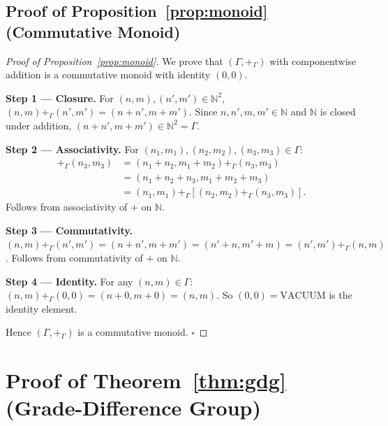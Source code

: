 
\subsection*{Proof of Proposition~\ref{prop:monoid} (Commutative Monoid)}
\label{app:proofs-monoid}

\begin{proof}[Proof of Proposition~\ref{prop:monoid}]
We prove that $(\Gamma, +_\Gamma)$ with componentwise addition is a
commutative monoid with identity $(0,0)$.

\medskip
\textbf{Step 1 --- Closure.}
For $(n,m),(n',m')\in\mathbb{N}^2$, $(n,m)+_\Gamma(n',m') = (n+n', m+m')$.
Since $n,n',m,m'\in\mathbb{N}$ and $\mathbb{N}$ is closed under addition,
$(n+n', m+m')\in\mathbb{N}^2 = \Gamma$. \checkmark

\medskip
\textbf{Step 2 --- Associativity.}
For $(n_1,m_1),(n_2,m_2),(n_3,m_3)\in\Gamma$:
\begin{align*}
  [(n_1,m_1)+_\Gamma(n_2,m_2)] +_\Gamma (n_3,m_3)
  &= (n_1+n_2, m_1+m_2) +_\Gamma (n_3,m_3) \\
  &= (n_1+n_2+n_3, m_1+m_2+m_3) \\
  &= (n_1,m_1) +_\Gamma [(n_2,m_2)+_\Gamma (n_3,m_3)].
\end{align*}
Follows from associativity of $+$ on $\mathbb{N}$. \checkmark

\medskip
\textbf{Step 3 --- Commutativity.}
$(n,m)+_\Gamma(n',m') = (n+n', m+m') = (n'+n, m'+m) = (n',m')+_\Gamma(n,m)$.
Follows from commutativity of $+$ on $\mathbb{N}$. \checkmark

\medskip
\textbf{Step 4 --- Identity.}
For any $(n,m)\in\Gamma$:
$(n,m)+_\Gamma(0,0) = (n+0,m+0) = (n,m)$.
So $(0,0) = \mathrm{VACUUM}$ is the identity element. \checkmark

Hence $(\Gamma, +_\Gamma)$ is a commutative monoid. $\square$
\end{proof}


\section{Proof of Theorem~\ref{thm:gdg} (Grade-Difference Group)}
\label{app:proofs-th2}

